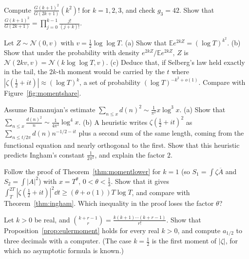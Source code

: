 \begin{exercise}[$\star$]\label{ex:gk}
Compute $\frac{G(k+1)^2}{G(2k+1)}(k^2)!$ for $k=1,2,3$, and check $g_3=42$. Show that $\frac{G(k+1)^2}{G(2k+1)}=\prod_{j=0}^{k-1}\frac{j!}{(j+k)!}$.
\end{exercise}

\begin{exercise}[$\star\star$]\label{ex:lognormal}
Let $Z\sim\mathcal N(0,v)$ with $v=\frac12\log\log T$. (a) Show that $\mathbb Ee^{2kZ}=(\log T)^{k^2}$. (b) Show that under the probability with density $e^{2kZ}/\mathbb Ee^{2kZ}$, $Z$ is $\mathcal N(2kv,v)=\mathcal N(k\log\log T,v)$. (c) Deduce that, if Selberg's law held exactly in the tail, the $2k$-th moment would be carried by the $t$ where $|\zeta(\frac12+it)|\approx(\log T)^k$, a set of probability $(\log T)^{-k^2+o(1)}$. Compare with Figure~\ref{fig:momentshare}.
\end{exercise}

\begin{exercise}[$\star\star$]\label{ex:diagonal4}
Assume Ramanujan's estimate $\sum_{n\le x}d(n)^2\sim\frac1{\pi^2}x\log^3x$. (a) Show that $\sum_{n\le x}\frac{d(n)^2}n\sim\frac1{4\pi^2}\log^4x$. (b) A heuristic writes $\zeta(\frac12+it)^2$ as $\sum_{n\le t/2\pi}d(n)n^{-1/2-it}$ plus a second sum of the same length, coming from the functional equation and nearly orthogonal to the first. Show that this heuristic predicts Ingham's constant $\frac1{2\pi^2}$, and explain the factor $2$.
\end{exercise}

\begin{exercise}[$\star$]\label{ex:k1}
Follow the proof of Theorem~\ref{thm:momentlower} for $k=1$ (so $S_1=\int\zeta\overline A$ and $S_2=\int|A|^2$) with $x=T^\theta$, $0<\theta<\frac13$. Show that it gives $\int_T^{2T}|\zeta(\frac12+it)|^2\dd t\ge(\theta+o(1))T\log T$, and compare with Theorem~\ref{thm:ingham}. Which inequality in the proof loses the factor $\theta$?
\end{exercise}

\begin{exercise}[$\star\star\star$]\label{ex:realk}
Let $k>0$ be real, and $\binom{k+r-1}r=\frac{k(k+1)\cdots(k+r-1)}{r!}$. Show that Proposition~\ref{prop:eulermoment} holds for every real $k>0$, and compute $a_{1/2}$ to three decimals with a computer. (The case $k=\frac12$ is the first moment of $|\zeta|$, for which no asymptotic formula is known.)
\end{exercise}


